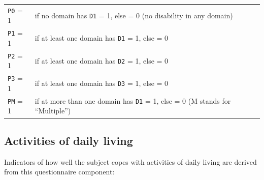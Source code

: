 \documentclass[12pt,a4paper]{book}
\theoremstyle{definition}
\theoremstyle{definition}
\theoremstyle{definition}
\theoremstyle{remark}
\begin{document}
\begin{longtable}[]{@{}ll@{}}
\toprule
\begin{minipage}[t]{0.11\columnwidth}\raggedright
\texttt{P0} = 1\strut
\end{minipage} & \begin{minipage}[t]{0.83\columnwidth}\raggedright
if no domain has \texttt{D1} = 1, else = 0 (no disability in any
domain)\strut
\end{minipage}\tabularnewline
\begin{minipage}[t]{0.11\columnwidth}\raggedright
\texttt{P1} = 1\strut
\end{minipage} & \begin{minipage}[t]{0.83\columnwidth}\raggedright
if at least one domain has \texttt{D1} = 1, else = 0\strut
\end{minipage}\tabularnewline
\begin{minipage}[t]{0.11\columnwidth}\raggedright
\texttt{P2} = 1\strut
\end{minipage} & \begin{minipage}[t]{0.83\columnwidth}\raggedright
if at least one domain has \texttt{D2} = 1, else = 0\strut
\end{minipage}\tabularnewline
\begin{minipage}[t]{0.11\columnwidth}\raggedright
\texttt{P3} = 1\strut
\end{minipage} & \begin{minipage}[t]{0.83\columnwidth}\raggedright
if at least one domain has \texttt{D3} = 1, else = 0\strut
\end{minipage}\tabularnewline
\begin{minipage}[t]{0.11\columnwidth}\raggedright
\texttt{PM} = 1\strut
\end{minipage} & \begin{minipage}[t]{0.83\columnwidth}\raggedright
if at more than one domain has \texttt{D1} = 1, else = 0 (M stands for
``Multiple'')\strut
\end{minipage}\tabularnewline
\bottomrule
\end{longtable}

\hypertarget{activities-of-daily-living}{%
\subsection{Activities of daily
living}\label{activities-of-daily-living}}

Indicators of how well the subject copes with activities of daily living
are derived from this questionnaire component:
\end{document}
